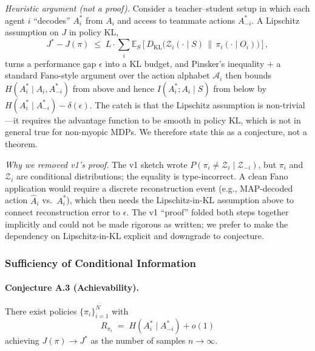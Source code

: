 \documentclass[10pt, letterpaper]{article}
\begin{document}
\emph{Heuristic argument (not a proof).} Consider a teacher--student setup in which each agent $i$ ``decodes'' $A_i^*$ from $A_i$ and access to teammate actions $A_{-i}^*$. A Lipschitz assumption on $J$ in policy KL,
\[J^* - J(\pi) \;\leq\; L \cdot \sum_i \mathbb{E}_S\!\left[D_\text{KL}\bigl(\mathcal{Z}_i(\cdot \mid S) \,\|\, \pi_i(\cdot \mid O_i)\bigr)\right],\]
turns a performance gap $\epsilon$ into a KL budget, and Pinsker's inequality + a standard Fano-style argument over the action alphabet $\mathcal{A}_i$ then bounds $H(A_i^*\mid A_i, A_{-i}^*)$ from above and hence $I(A_i^*; A_i \mid S)$ from below by $H(A_i^*\mid A_{-i}^*) - \delta(\epsilon)$. The catch is that the Lipschitz assumption is non-trivial---it requires the advantage function to be smooth in policy KL, which is not in general true for non-myopic MDPs. We therefore state this as a conjecture, not a theorem.

\emph{Why we removed v1's proof.} The v1 sketch wrote $P(\pi_i \neq \mathcal{Z}_i \mid \mathcal{Z}_{-i})$, but $\pi_i$ and $\mathcal{Z}_i$ are conditional distributions; the equality is type-incorrect. A clean Fano application would require a discrete reconstruction event (e.g., MAP-decoded action $\hat{A}_i$ vs.\ $A_i^*$), which then needs the Lipschitz-in-KL assumption above to connect reconstruction error to $\epsilon$. The v1 ``proof'' folded both steps together implicitly and could not be made rigorous as written; we prefer to make the dependency on Lipschitz-in-KL explicit and downgrade to conjecture.

\subsubsection{Sufficiency of Conditional Information}

\paragraph{Conjecture A.3 (Achievability).} There exist policies $\{\pi_i\}_{i=1}^N$ with
\[R_{\pi_i} \;=\; H(A_i^* \mid A_{-i}^*) + o(1)\]
achieving $J(\pi) \to J^*$ as the number of samples $n \to \infty$.
\end{document}
